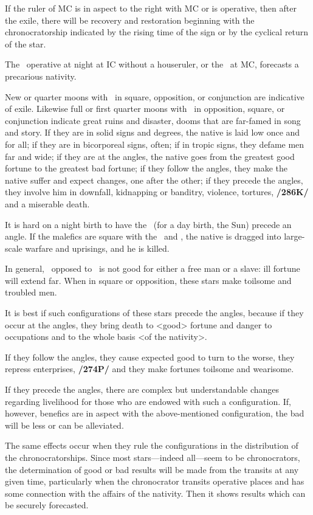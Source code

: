 If the ruler of MC is in aspect to the right with MC or is operative, then after the exile, there will be recovery and restoration beginning with the chronocratorship indicated by the rising time of the sign or by the cyclical return of the star. 

The \Sun\, operative at night at IC without a houseruler, or the \Moon\, at MC, forecasts a precarious nativity. 

New or quarter moons with \Saturn\, in square, opposition, or conjunction are indicative of exile. Likewise full or first quarter moons with \Mars\, in opposition, square, or conjunction indicate great ruins and disaster, dooms that are far-famed in song and story. If they are in solid signs and degrees, the native is laid low once and for all; if they are in bicorporeal signs, often; if in tropic signs, they defame men far and wide; if they are at the angles, the native goes from the greatest good fortune to the greatest bad fortune; if they follow the angles, they make the native suffer and expect changes, one after the other; if they precede the angles, they involve him in downfall, kidnapping or banditry, violence, tortures, \textbf{/286K/} and a miserable death. 

It is hard on a night birth to have the \Moon\, (for a day birth, the Sun) precede an angle. If the malefics are square with the \Sun\, and \Moon, the native is dragged into large-scale warfare and uprisings, and he is killed.

In \mndl general, \Saturn\, opposed to \Mars\, is not good for either a free man or a slave: ill fortune will extend far. When in square or opposition, these stars make toilsome and troubled men. 

It is best if such configurations of these stars precede the angles, because if they occur at the angles, they bring death to <good> fortune and danger to occupations and to the whole basis <of the nativity>. 

If they follow the angles, they cause expected good to turn to the worse, they repress enterprises, \textbf{/274P/} and they make fortunes toilsome and wearisome. 

If they precede the angles, there are complex but understandable changes regarding livelihood for those who are endowed with such a configuration. If, however, benefics are in aspect with the above-mentioned configuration, the bad will be less or can be alleviated.

The \mnt same effects occur when they rule the configurations in the distribution of the chronocratorships. Since most stars—indeed all—seem to be chronocrators, the determination of good or bad results will be made from the transits at any given time, particularly when the chronocrator transits operative places and has some connection with the affairs of the nativity. Then it shows results which can be securely
forecasted.

